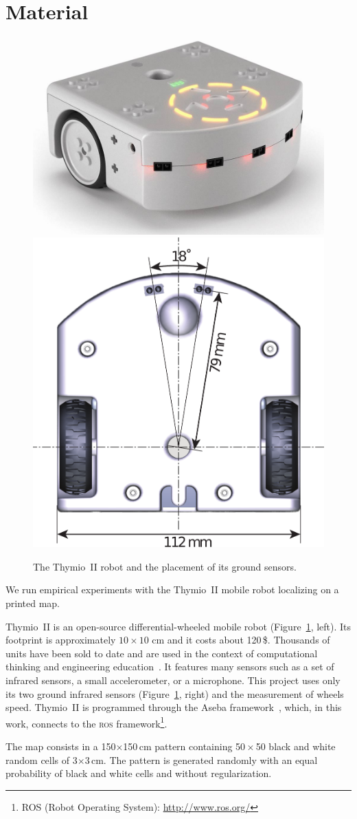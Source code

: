 \documentclass[letterpaper, 10pt, conference]{ieeeconf}
\newcommand{\fig}[1]{Figure~\ref{fig:#1}}
\begin{document}
\section{Material}
\begin{figure}
\includegraphics[width=.56\columnwidth]{thymio2-shadow}\hfill
\includegraphics[width=.42\columnwidth]{thymio2-dimensions}
\caption{The Thymio~II robot and the placement of its ground sensors.}
\label{fig:thymio}
\end{figure}

We run empirical experiments with the Thymio~II mobile robot localizing on a printed map.

Thymio~II is an open-source differential-wheeled mobile robot (\fig{thymio}, left).
Its footprint is approximately $10 \times 10$ cm and it costs about 120\,\$.
Thousands of units have been sold to date and are used in the context of computational thinking and engineering education~\cite{riedo2015thymio}.
It features many sensors such as a set of infrared sensors, a small accelerometer, or a microphone.
This project uses only its two ground infrared sensors (\fig{thymio}, right) and the measurement of wheels speed.
Thymio~II is programmed through the Aseba framework~\cite{aseba2011tmech}, which, in this work, connects to the \textsc{ros} framework\footnote{ROS (Robot Operating System): \url{http://www.ros.org/}}.

The map consists in a 150$\times$150\,cm pattern containing 50\,$\times$\,50 black and white random cells of 3$\times$3\,cm.
The pattern is generated randomly with an equal probability of black and white cells and without regularization.
\end{document}
